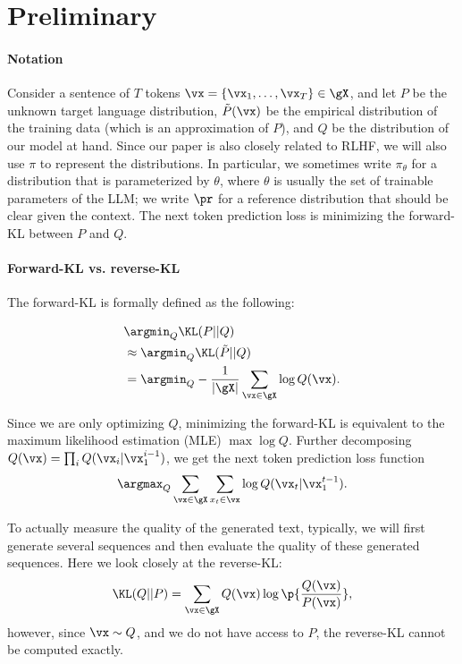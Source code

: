 \section{Preliminary}

\paragraph{Notation} Consider a sentence of $T$ tokens $\vx=\{\vx_1,\ldots, \vx_T\}\in\gX$, and let $P$ be the unknown target language distribution, $\tilde P(\vx)$ be the empirical distribution of the training data (which is an approximation of $P$), and $Q$ be the distribution of our model at hand. Since our paper is also closely related to RLHF, we will also use $\pi$ to represent the distributions. In particular, we sometimes write $\pi_\theta$ for a distribution that is parameterized by $\theta$, where $\theta$ is usually the set of trainable parameters of the LLM; we write $\pr$ for a reference distribution that should be clear given the context. The next token prediction loss is minimizing the forward-KL between $P$ and $Q$. 

\paragraph{Forward-KL vs. reverse-KL} The forward-KL is formally defined as the following:

\begin{align*}
\begin{split}
	&\argmin_Q \KL(P||Q) \\
        & \approx \argmin_Q \KL(\tilde P||Q) \\
    & =\argmin_Q -\frac{1}{|\gX|}\sum_{\vx\in\gX}\log{Q(\vx)}.
\end{split}
\end{align*}

Since we are only optimizing $Q$, minimizing the forward-KL is equivalent to the maximum likelihood estimation (MLE) $\max \log Q$. Further decomposing $Q(\vx)=\prod_i Q(\vx_i|\vx_1^{i-1})$, we get the next token prediction loss function
\begin{align}\label{eq:mle_objective}
	\argmax_Q\sum_{\vx\in\gX} \sum_{x_t\in\vx} \log Q(\vx_t|\vx_{1}^{t-1}).
\end{align}

To actually measure the quality of the generated text, typically, we will first generate several sequences and then evaluate the quality of these generated sequences. Here we look closely at the reverse-KL:
\begin{align}
	\KL(Q||P) = \sum_{\vx\in\gX}Q(\vx)\log\p{\frac{Q(\vx)}{P(\vx)}},
\end{align}
however, since $\vx\sim Q$, and we do not have access to $P$, the reverse-KL cannot be computed exactly.

